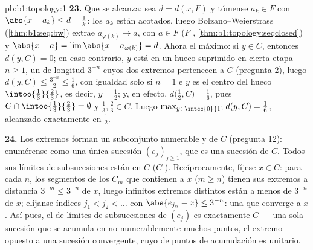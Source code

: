 \begin{solution}{pb:b1:topology:1}
\textbf{23.} Que se alcanza: sea $d = d(x, F)$ y tómense $a_k \in F$
con $\abs{x - a_k} \leq d + \frac1k$: los $a_k$ están acotados, luego
Bolzano--Weierstrass (\cref{thm:b1:seq:bw}) extrae
$a_{\varphi(k)} \to a$, con $a \in F$ ($F$ ,
\cref{thm:b1:topology:seqclosed}) y
$\abs{x - a} = \lim \abs{x - a_{\varphi(k)}} = d$. Ahora el máximo:
si $y \in C$, entonces $d(y, C) = 0$; en caso contrario, $y$ está en
un hueco suprimido en cierta etapa $n \geq 1$, un 
 de longitud $3^{-n}$ cuyos dos extremos pertenecen a $C$
(pregunta 2), luego $d(y, C) \leq \frac{3^{-n}}{2} \leq \frac16$,
con igualdad solo si $n = 1$ e $y$ es el centro del hueco
$\intoo{\frac13}{\frac23}$, es decir, $y = \frac12$; y, en efecto,
$d\bigl(\frac12, C\bigr) = \frac16$, pues
$C \cap \intoo{\frac13}{\frac23} = \emptyset$ y
$\frac13, \frac23 \in C$. Luego
$\max_{y\in\intcc{0}{1}} d(y, C) = \frac16$, alcanzado exactamente
en $\frac12$.

\textbf{24.} Los extremos forman un subconjunto numerable y  de
$C$ (pregunta 12): enumérense como una única sucesión
$(e_j)_{j\geq1}$, que es una sucesión de $C$. Todos sus límites de
subsucesiones están en $C$ ($C$ ). Recíprocamente, fíjese
$x \in C$: para cada $n$, los segmentos de los $C_m$ que contienen a
$x$ ($m \geq n$) tienen sus extremos a distancia
$3^{-m} \leq 3^{-n}$ de $x$, luego infinitos extremos distintos
están a menos de $3^{-n}$ de $x$; elíjanse índices
$j_1 < j_2 < \dots$ con $\abs{e_{j_n} - x} \leq 3^{-n}$: una
 que converge a $x$. Así pues, el  de límites de
subsucesiones de $(e_j)$ es exactamente $C$ --- una sola sucesión que
se acumula en no numerablemente muchos puntos, el extremo opuesto a
una sucesión convergente, cuyo  de puntos de acumulación es
unitario.


\end{solution}
